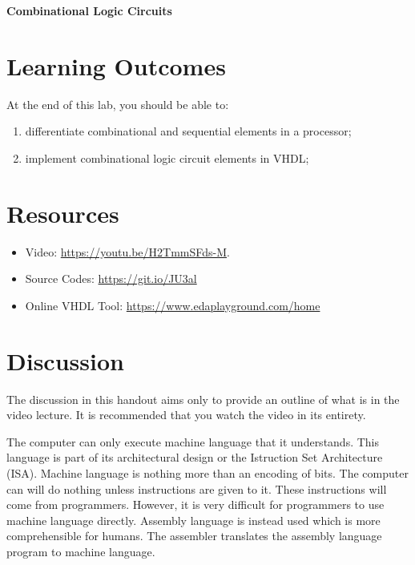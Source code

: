 \documentclass[a4paper, 11pt,oneside]{article}
\begin{document}
\begin{center}
	{\LARGE \textbf{Combinational Logic Circuits}}
\end{center}

\section*{Learning Outcomes}
   At the end of this lab, you should be able to:
   \begin{enumerate}[itemsep=0pt,parsep=0pt]
   	   \item differentiate combinational and sequential elements in a processor;
       \item implement combinational logic circuit elements in VHDL;

   \end{enumerate}   

\tableofcontents

\section{Resources}
\begin{itemize}
	\item Video: \href{https://youtu.be/H2TmmSFds-M}{https://youtu.be/H2TmmSFds-M}.
	\item Source Codes: \href{https://git.io/JU3al}{https://git.io/JU3al}
	\item Online VHDL Tool: \href{https://www.edaplayground.com/home}
		{https://www.edaplayground.com/home}
\end{itemize}	


\section{Discussion}
The discussion in this handout aims only to provide an outline of what is in the video lecture. It is recommended that you watch the video in its entirety.

The computer can only execute machine language that it understands. This language is part of its architectural design or the Istruction Set Architecture (ISA). Machine language is nothing more than an encoding of bits. The computer can will do nothing unless instructions are given to it. These instructions will come from programmers. However, it is very difficult for programmers to use machine language directly. Assembly language is instead used which is more comprehensible for humans. The assembler translates the assembly language program to machine language. 
\end{document}
